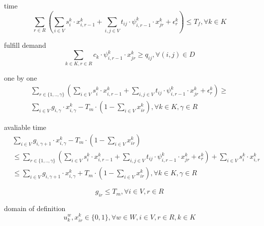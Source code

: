 \documentclass[preprint,12pt,authoryear]{elsarticle}
\begin{document}
time
\begin{equation}
    \sum_{r\in R}{(
        \sum_{i\in V}{s_i^k\cdot x_{i,r-1}^k}
        +\sum_{i,j\in V}{t_{ij}\cdot \psi_{i,r-1}^k\cdot x_{jr}^k}
        +\epsilon_r^k
    )}
    \leq T_f,
    \forall k\in K
\label{tm}
\end{equation}

fulfill demand
\begin{equation}
    \sum_{k\in K,r\in R}{c_k\cdot \psi_{i,r-1}^k\cdot x_{jr}^k}\geq q_{ij}, \forall (i,j)\in D
\label{fd}
\end{equation}

one by one
\begin{equation}
    \begin{split}
        \sum_{r\in \{1,..,\gamma\}}{(
            \sum_{i\in V}{s_i^k\cdot x_{i,r-1}^k}
            +\sum_{i,j\in V}{t_{ij}\cdot \psi_{i,r-1}^k\cdot x_{jr}^k}
            +\epsilon_r^k
        )} \geq \\
        \sum_{i\in V}{g_{i,\gamma}\cdot x_{i,\gamma}^k}-T_m\cdot(1-\sum_{i\in V}{x_{ir}^k}),
        \forall k\in K,\gamma \in R
    \end{split}
\label{1b1}
\end{equation}

avaliable time
\begin{equation}
    \begin{split}
        &\sum_{i\in V}{g_{i,\gamma+1}\cdot x_{i,\gamma}^k}-T_m\cdot(1-\sum_{i\in V}{x_{ir}^k})\\
        &\leq \sum_{r\in \{1,..,\gamma\}}{(
            \sum_{i\in V}{s_i^k\cdot x_{i,r-1}^k}
            +\sum_{i,j\in V}{t_{ij}\cdot \psi_{i,r-1}^k\cdot x_{jr}^k}
            +\epsilon_r^k
        )} + \sum_{i\in V}{s_i^k\cdot x_{i,r}^k}\\
        &\leq \sum_{i\in V}{g_{i,\gamma+1}\cdot x_{i,\gamma}^k} + T_m\cdot(1-\sum_{i\in V}{x_{ir}^k}),
        \forall k\in K,\gamma \in R
    \end{split}
\label{avlt}
\end{equation}

\begin{equation}
    g_{ir}\leq T_m, \forall i\in V,r\in R
\label{mxms}
\end{equation}

domain of definition
\begin{equation}
    u_k^w,x_{ir}^k\in \{0,1\}, \forall w\in W, i\in V,r\in R,k\in K
\label{ddb}
\end{equation}
\end{document}

